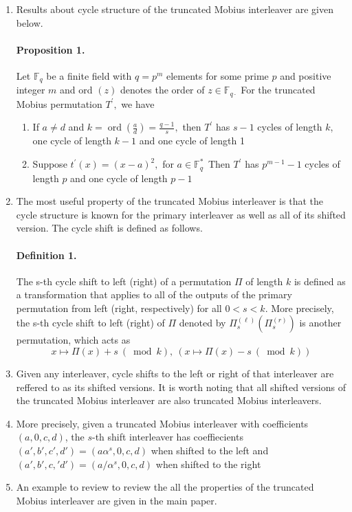 \documentclass[fontsize=12pt]{article}
\begin{document}
\begin{enumerate}
\item Results about cycle structure of the truncated Mobius interleaver are given below. 
\paragraph{Proposition 1. \newline} Let $\mathbb{F}_{q}$ be a finite field with $q=p^{m}$ elements for some prime $p$ and positive integer $m$ and ord $(z)$ denotes the order of $z \in \mathbb{F}_{q \cdot}$ For the truncated Mobius permutation
$T^{\prime},$ we have
\begin{enumerate}
\item If $a \neq d$ and $k=\operatorname{ord}\left(\frac{a}{d}\right)=\frac{q-1}{s},$ then $T^{\prime}$ has $s-1$
cycles of length $k$, one cycle of length $k-1$ and one cycle of length 1
\item Suppose $t^{\prime}(x)=(x-a)^{2},$ for $a \in \mathbb{F}_{q^{.}}^{*}$ Then $T^{\prime}$ has $p^{m-1}-1$ cycles of length $p$ and one cycle of length $p-1$
\end{enumerate}

\item The most useful property of the truncated Mobius interleaver is that the cycle structure is known for the primary interleaver as well as all of its shifted version. The cycle shift is defined as follows.

\paragraph{Definition 1. \newline} The s-th cycle shift to left (right) of a permutation $\Pi$ of length $k$ is defined as a transformation that applies to all of the outputs of the primary permutation from left (right, respectively) for all $0<s<k$. More 
precisely, the s-th cycle shift to left (right) of $\Pi$ denoted by $\Pi_{s}^{(\ell)}\left(\Pi_{s}^{(r)}\right)$ is another permutation, which acts as 
$$x \mapsto \Pi(x)+s \:(\bmod k), \:\left(x \mapsto \Pi(x)-s \:(\bmod k)\right)$$

\item Given any interleaver, cycle shifts to the left or right of that interleaver are reffered to as its shifted versions. It is worth noting that all shifted versions of the truncated Mobius interleaver are also truncated Mobius interleavers.

\item More precisely, given a truncated Mobius interleaver with coefficients $(a,0,c,d)$, the $s$-th shift interleaver has coeffiecients $(a', b', c', d') = (a\alpha^s, 0, c, d )$ when shifted to the left and $(a', b', c,' d') = (a/\alpha^s, 0, c, d )$ when shifted to the right

\item An example to review to review the all the properties of the truncated Mobius interleaver are given in the main paper.
\end{enumerate}
\end{document}
